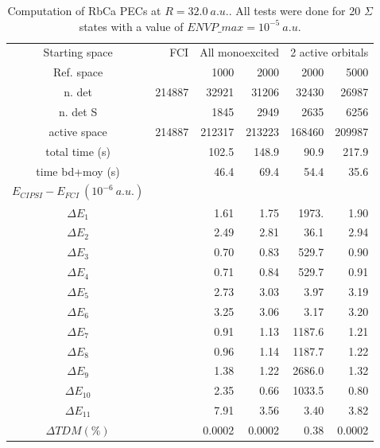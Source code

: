 \documentclass[a4paper,10pt]{article}
\begin{document}
\begin{table*}[htbp]
  \begin{center}
 \begin{tabular}{|c|r|r|r|r|r|}
 \hline
Starting space & FCI &\multicolumn{2}{|c|}{ All monoexcited } & \multicolumn{2}{|c|}{ 2 active orbitals } \\
Ref. space &  & 1000 & 2000  & 2000 & 5000 \\
 \hline
n. det          		&214887	&32921	&31206	&32430	&26987	\\
n. det S        	 	& 	& 1845	&2949	&2635	&6256	\\
active space			&214887	&212317	&213223	&168460	&209987	\\
total time (s)    	        &	&102.5	&148.9	&90.9	&217.9	\\
time bd+moy (s)    		& 	&46.4	&69.4	&54.4	&35.6	\\
\hline
\hline
$E_{CIPSI} - E_{FCI} ~(10^{-6}~a.u.)$ & & & & &  \\
$\Delta E_1 $    		&	& 1.61	&1.75	&1973.	&1.90\\
$\Delta E_2 $    		&	& 2.49	&2.81	&36.1	&2.94\\
$\Delta E_3 $   	 	&	& 0.70	&0.83	&529.7	&0.90\\
$\Delta E_4 $   	 	&	& 0.71	&0.84	&529.7	&0.91\\
$\Delta E_5 $   	 	&	& 2.73	&3.03	&3.97	&3.19 \\
$\Delta E_6 $   	 	&	& 3.25	&3.06	&3.17	&3.20 \\
$\Delta E_7 $   	 	&	& 0.91	&1.13	&1187.6	&1.21 \\
$\Delta E_8$    		&	& 0.96	&1.14	&1187.7	&1.22 \\
$\Delta E_9 $  		  	&	& 1.38	&1.22	&2686.0	&1.32 \\
$\Delta E_{10} $  	 	&	& 2.35	&0.66	&1033.5	&0.80 \\
$\Delta E_{11} $ 	  	&	& 7.91	&3.56	&3.40	&3.82\\
\hline
\hline
$\Delta TDM (\%)$		&	&0.0002	&0.0002	&0.38	&0.0002\\
\hline
 \end{tabular}
 \caption{\label{table32} \small Computation of RbCa PECs at $R=32.0~a.u.$. All tests were done for 20 $\Sigma$ states with a value of ${ENVP\_max}=10^{-5}~a.u.$} 
 \end{center}
\end{table*}
\end{document}
